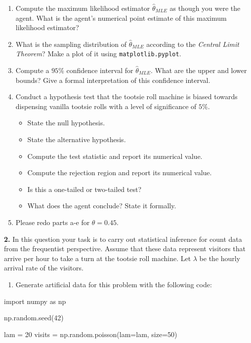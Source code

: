 \documentclass[
  letterpaper,
  DIV=11,
  numbers=noendperiod]{scrartcl}
\newenvironment{Shaded}{\begin{snugshade}}{\end{snugshade}}
\newcommand{\DecValTok}[1]{\textcolor[rgb]{0.68,0.00,0.00}{#1}}
\newcommand{\ImportTok}[1]{\textcolor[rgb]{0.00,0.46,0.62}{#1}}
\newcommand{\NormalTok}[1]{\textcolor[rgb]{0.00,0.23,0.31}{#1}}
\newcommand{\OperatorTok}[1]{\textcolor[rgb]{0.37,0.37,0.37}{#1}}
\providecommand{\tightlist}{%
  \setlength{\itemsep}{0pt}\setlength{\parskip}{0pt}}\usepackage{longtable,booktabs,array}
\begin{document}
\begin{enumerate}
\def\labelenumi{\alph{enumi}.}
\setcounter{enumi}{1}
\item
  Compute the maximum likelihood estimator \(\hat{\theta}_{MLE}\) as
  though you were the agent. What is the agent's numerical point
  estimate of this maximum likelihood estimator?
\item
  What is the sampling distribution of \(\hat{\theta}_{MLE}\) according
  to the \emph{Central Limit Theorem}? Make a plot of it using
  \texttt{matplotlib.pyplot}.
\item
  Compute a \(95\%\) confidence interval for \(\hat{\theta}_{MLE}\).
  What are the upper and lower bounds? Give a formal interpretation of
  this confidence interval.
\item
  Conduct a hypothesis test that the tootsie roll machine is biased
  towards dispensing vanilla tootsie rolls with a level of significance
  of \(5\%\).

  \begin{itemize}
  \tightlist
  \item
    State the null hypothesis.
  \item
    State the alternative hypothesis.
  \item
    Compute the test statistic and report its numerical value.
  \item
    Compute the rejection region and report its numerical value.
  \item
    Is this a one-tailed or two-tailed test?
  \item
    What does the agent conclude? State it formally.
  \end{itemize}
\item
  Please redo parts a-e for \(\theta = 0.45\).
\end{enumerate}

\textbf{2.} In this question your task is to carry out statistical
inference for count data from the frequentist perspective. Assume that
these data represent visitors that arrive per hour to take a turn at the
tootsie roll machine. Let \(\lambda\) be the hourly arrival rate of the
visitors.

\begin{enumerate}
\def\labelenumi{\alph{enumi}.}
\tightlist
\item
  Generate artificial data for this problem with the following code:
\end{enumerate}

\begin{Shaded}
\begin{Highlighting}[]
\ImportTok{import}\NormalTok{ numpy }\ImportTok{as}\NormalTok{ np}

\NormalTok{np.random.seed(}\DecValTok{42}\NormalTok{)}

\NormalTok{lam }\OperatorTok{=} \DecValTok{20}
\NormalTok{visits }\OperatorTok{=}\NormalTok{ np.random.poisson(lam}\OperatorTok{=}\NormalTok{lam, size}\OperatorTok{=}\DecValTok{50}\NormalTok{)}
\end{Highlighting}
\end{Shaded}
\end{document}
